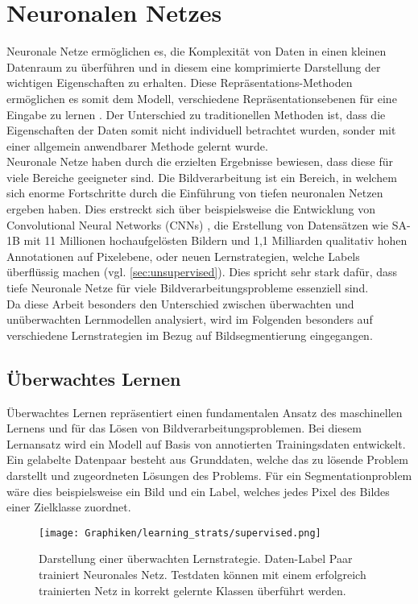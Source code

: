 \section{Neuronalen Netzes}
Neuronale Netze ermöglichen es, die Komplexität von Daten in einen kleinen Datenraum zu überführen und in diesem eine komprimierte Darstellung der wichtigen Eigenschaften zu erhalten. Diese Repräsentations-Methoden ermöglichen es somit dem Modell, verschiedene Repräsentationsebenen für eine Eingabe zu lernen \cite{deepLearningLeCun2015}. Der Unterschied zu traditionellen Methoden ist, dass die Eigenschaften der Daten somit nicht individuell betrachtet wurden, sonder mit einer allgemein anwendbarer Methode gelernt wurde. \\
Neuronale Netze haben durch die erzielten Ergebnisse bewiesen, dass diese für viele Bereiche geeigneter sind. Die Bildverarbeitung ist ein Bereich, in welchem sich enorme Fortschritte durch die Einführung von tiefen neuronalen Netzen ergeben haben. Dies erstreckt sich über beispielsweise die Entwicklung von Convolutional Neural Networks (CNNs) \cite{CNNsCunHBB99}, die Erstellung von Datensätzen wie SA-1B \cite{SAMKirillov2023} mit 11 Millionen hochaufgelösten Bildern und 1,1 Milliarden qualitativ hohen Annotationen auf Pixelebene, oder neuen Lernstrategien, welche Labels überflüssig machen (vgl. \ref{sec:unsupervised}). Dies spricht sehr stark dafür, dass tiefe Neuronale Netze für viele Bildverarbeitungsprobleme essenziell sind. \\
Da diese Arbeit besonders den Unterschied zwischen überwachten und unüberwachten Lernmodellen analysiert, wird im Folgenden besonders auf verschiedene Lernstrategien im Bezug auf Bildsegmentierung eingegangen.  

    
\subsection{Überwachtes Lernen}
\label{sec:supervised}
Überwachtes Lernen repräsentiert einen fundamentalen Ansatz des maschinellen Lernens und für das Lösen von Bildverarbeitungsproblemen. Bei diesem Lernansatz wird ein Modell auf Basis von annotierten Trainingsdaten entwickelt. Ein gelabelte Datenpaar besteht aus Grunddaten, welche das zu lösende Problem darstellt und zugeordneten Lösungen des Problems. Für ein Segmentationproblem wäre dies beispielsweise ein Bild und ein Label, welches jedes Pixel des Bildes einer Zielklasse zuordnet.\\
\begin{figure}[h!]
    \centering
    \texttt{[image: Graphiken/learning\_strats/supervised.png]}
    \caption{Darstellung einer überwachten Lernstrategie. Daten-Label Paar trainiert Neuronales Netz. Testdaten können mit einem erfolgreich trainierten Netz in korrekt gelernte Klassen überführt werden.}
    \label{fig:supervised}
\end{figure}

